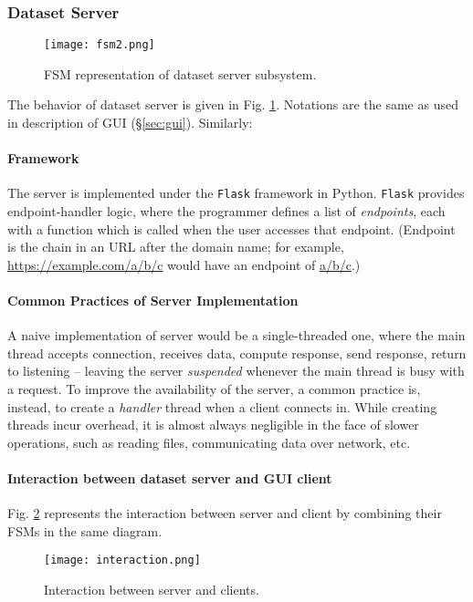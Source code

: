 \subsubsection{Dataset Server}

\begin{figure}
    \centering
    \texttt{[image: fsm2.png]}
    \caption{FSM representation of dataset server subsystem.}
    \label{fig:fsm_server}
\end{figure}

The behavior of dataset server is given in Fig. \ref{fig:fsm_server}. Notations are the same as used in description of GUI (\S\ref{sec:gui}). Similarly:

\paragraph{Framework} The server is implemented under the \texttt{Flask} framework in Python. \texttt{Flask} provides endpoint-handler logic, where the programmer defines a list of \textit{endpoints}, each with a function which is called when the user accesses that endpoint. (Endpoint is the chain in an URL after the domain name; for example, \url{https://example.com/a/b/c} would have an endpoint of \url{a/b/c}.)

\paragraph{Common Practices of Server Implementation} A naive implementation of server would be a single-threaded one, where the main thread accepts connection, receives data, compute response, send response, return to listening -- leaving the server \textit{suspended} whenever the main thread is busy with a request. To improve the availability of the server, a common practice is, instead, to create a \textit{handler} thread when a client connects in. While creating threads incur overhead, it is almost always negligible in the face of slower operations, such as reading files, communicating data over network, etc.

\paragraph{Interaction between dataset server and GUI client} Fig. \ref{fig:interaction} represents the interaction between server and client by combining their FSMs in the same diagram. 

\begin{figure}
    \centering
    \texttt{[image: interaction.png]}
    \caption{Interaction between server and clients.}
    \label{fig:interaction}
\end{figure}

